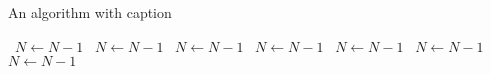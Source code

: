 \documentclass[a4paper]{article}
\begin{document}
\begin{algorithm}
\caption{An algorithm with caption}
\begin{algorithmic}
\    \State $N \gets N - 1$
\    \State $N \gets N - 1$
\    \State $N \gets N - 1$
\    \State $N \gets N - 1$
\    \State $N \gets N - 1$
\    \State $N \gets N - 1$
\    \State $N \gets N - 1$
\EndWhile
\end{algorithmic}
\end{algorithm}
\end{document}
